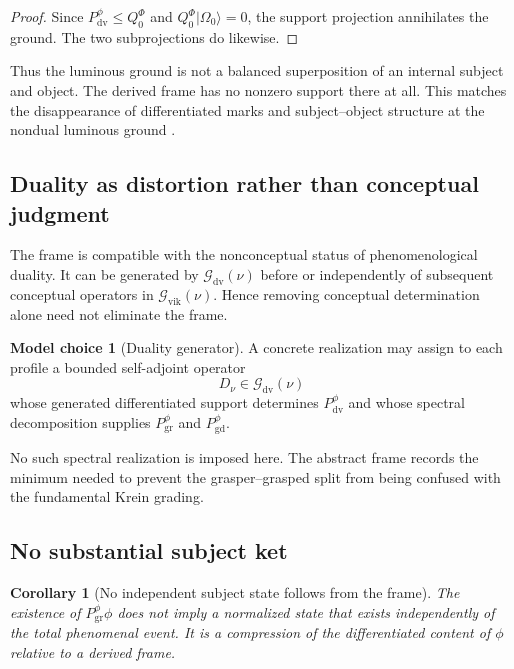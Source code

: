 \documentclass[11pt,reqno]{scrartcl}
\newcommand{\QzeroF}{Q_{0}^{\Phi}}
\newcommand{\ket}[1]{\lvert #1\rangle}
\newcommand{\vas}{\nu}
\newcommand{\Gvik}{\mathcal G_{\mathrm{vik}}}
\newcommand{\Gdv}{\mathcal G_{\mathrm{dv}}}
\newcommand{\Pdual}{P_{\mathrm{dv}}^{\phi}}
\newcommand{\Pgrasper}{P_{\mathrm{gr}}^{\phi}}
\newcommand{\Pgrasped}{P_{\mathrm{gd}}^{\phi}}
\theoremstyle{plain}
\newtheorem{corollary}[corollary]{Corollary}
\theoremstyle{definition}
\newtheorem{modelchoice}[modelchoice]{Model choice}
\theoremstyle{remark}
\begin{document}
\begin{proof}
Since $\Pdual\leq\QzeroF$ and
$\QzeroF\ket{\Omega_0}=0$, the support projection annihilates the ground.
The two subprojections do likewise.
\end{proof}

Thus the luminous ground is not a balanced superposition of an internal
subject and object.  The derived frame has no nonzero support there at all.
This matches the disappearance of differentiated marks and subject--object
structure at the nondual luminous ground
\cite[pp.~182--185]{Yiannopoulos2012}.

\subsection{Duality as distortion rather than conceptual judgment}

The frame is compatible with the nonconceptual status of phenomenological
duality.  It can be generated by $\Gdv(\vas)$ before or independently of
subsequent conceptual operators in $\Gvik(\vas)$.  Hence removing conceptual
determination alone need not eliminate the frame.

\begin{modelchoice}[Duality generator]
\label{choice:duality-generator}
A concrete realization may assign to each profile a bounded self-adjoint
operator
\begin{equation}
  D_{\vas}\in\Gdv(\vas)
  \label{eq:duality-generator}
\end{equation}
whose generated differentiated support determines
$\Pdual$ and whose spectral decomposition supplies
$\Pgrasper$ and $\Pgrasped$.
\end{modelchoice}

No such spectral realization is imposed here.  The abstract frame
records the minimum needed to prevent the grasper--grasped split from being
confused with the fundamental Krein grading.

\subsection{No substantial subject ket}

\begin{corollary}[No independent subject state follows from the frame]
\label{cor:no-independent-subject-ket}
The existence of $\Pgrasper\phi$ does not imply a normalized state that exists
independently of the total phenomenal event.  It is a compression of the
differentiated content of $\phi$ relative to a derived frame.
\end{corollary}
\end{document}

